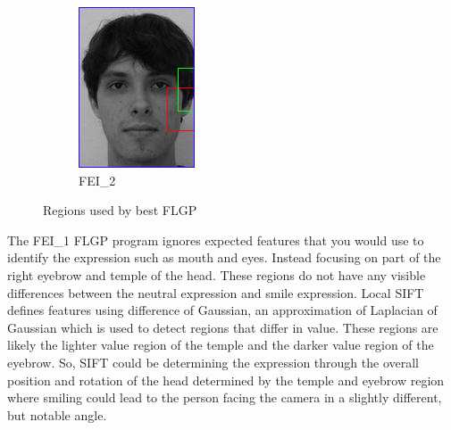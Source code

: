 \documentclass{article}
\begin{document}
\begin{figure}[h!]
\begin{subfigure}{0.49\linewidth}
		\includegraphics[width=\linewidth]{flgp_selection_f2.jpg}
		\caption{FEI\_2}
	\end{subfigure}
	\caption{Regions used by best FLGP}
\end{figure}
\noindent The FEI\_1 FLGP program ignores expected features that you would use to identify the expression such as mouth and eyes. Instead focusing on part of the right eyebrow and temple of the head. These regions do not have any visible differences between the neutral expression and smile expression. Local SIFT defines features using difference of Gaussian, an approximation of Laplacian of Gaussian which is used to detect regions that differ in value. These regions are likely the lighter value region of the temple and the darker value region of the eyebrow. So, SIFT could be determining the expression through the overall position and rotation of the head determined by the temple and eyebrow region where smiling could lead to the person facing the camera in a slightly different, but notable angle.  \par
\end{document}
